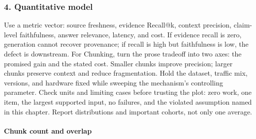 \subsubsection*{4. Quantitative model}
Use a metric vector: source freshness, evidence Recall@k, context precision, claim-level faithfulness, answer relevance, latency, and cost. If evidence recall is zero, generation cannot recover provenance; if recall is high but faithfulness is low, the defect is downstream.
For Chunking, turn the prose tradeoff into two axes: the promised gain and the stated cost. Smaller chunks improve precision; larger chunks preserve context and reduce fragmentation. Hold the dataset, traffic mix, versions, and hardware fixed while sweeping the mechanism's controlling parameter.
Check units and limiting cases before trusting the plot: zero work, one item, the largest supported input, no failures, and the violated assumption named in this chapter. Report distributions and important cohorts, not only one average.
\paragraph{Chunk count and overlap}
